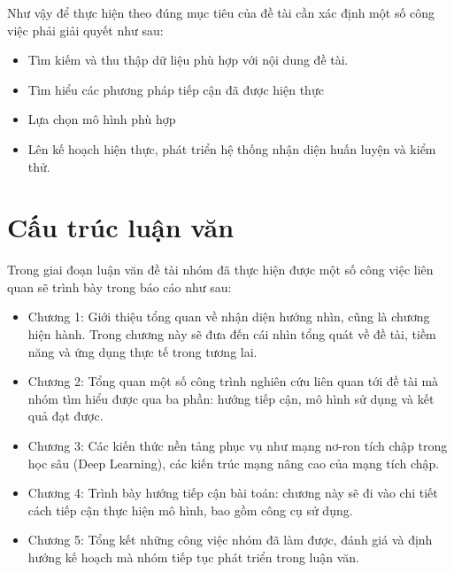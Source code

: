 Như vậy để thực hiện theo đúng mục tiêu của đề tài cần xác định một số công việc phải giải quyết như sau:
\begin{itemize}
\item Tìm kiếm và thu thập dữ liệu phù hợp với nội dung đề tài.
\item Tìm hiểu các phương pháp tiếp cận đã được hiện thực
\item Lựa chọn mô hình phù hợp
\item Lên kế hoạch hiện thực, phát triển hệ thống nhận diện huấn luyện và kiểm thử.
\end{itemize}
\section{Cấu trúc luận văn}
Trong giai đoạn luận văn đề tài nhóm đã thực hiện được một số công việc liên quan sẽ trình bày trong báo cáo như sau:

\begin{itemize}
\item Chương 1: Giới thiệu tổng quan về nhận diện hướng nhìn, cũng là chương hiện hành. Trong chương này sẽ đưa đến cái nhìn tổng quát về đề tài, tiềm năng và ứng dụng thực tế trong tương lai.
\item Chương 2: Tổng quan một số công trình nghiên cứu liên quan tới đề tài mà nhóm tìm hiểu được qua ba phần: hướng tiếp cận, mô hình sử dụng và kết quả đạt được.
\item Chương 3: Các kiến thức nền tảng phục vụ như mạng nơ-ron tích chập trong học sâu (Deep Learning), các kiến trúc mạng nâng cao của mạng tích chập.
\item Chương 4: Trình bày hướng tiếp cận bài toán: chương này sẽ đi vào chi tiết cách tiếp cận thực hiện mô hình, bao gồm công cụ sử dụng.
\item Chương 5: Tổng kết những công việc nhóm đã làm được, đánh giá và định hướng kế hoạch mà nhóm tiếp tục phát triển trong luận văn.
\end{itemize}
